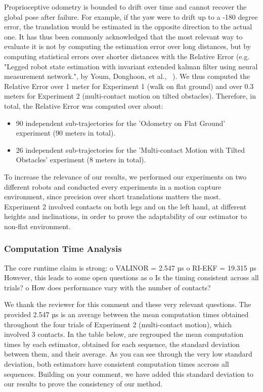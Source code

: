 Proprioceptive odometry is bounded to drift over time and cannot recover the global pose after failure. For example, if the yaw were to drift up to a -180 degree error, the translation would be estimated in the opposite direction to the actual one. It has thus been commonly acknowledged that the most relevant way to evaluate it is not by computing the estimation error over long distances, but by computing statistical errors over shorter distances with the Relative Error (e.g. "Legged robot state estimation with invariant extended kalman filter using neural measurement network.", by Youm, Donghoon, et al., ~\cite{yoon2023InvariantSmootherDynamicContactEventInformation}). We thus computed the Relative Error over 1 meter for Experiment 1 (walk on flat ground) and over 0.3 meters for Experiment 2 (multi-contact motion on tilted obstacles). Therefore, in total, the Relative Error was computed over about:
\begin{itemize}
    \item 90 independent sub-trajectories for the 'Odometry on Flat Ground' experiment (90 meters in total).
    \item 26 independent sub-trajectories for the 'Multi-contact Motion with Tilted Obstacles' experiment (8 meters in total).
\end{itemize}
To increase the relevance of our results, we performed our experiments on two different robots and conducted every experiments in a motion capture environment, since precision over short translations matters the most. Experiment 2 involved contacts on both legs and on the left hand, at different heights and inclinations, in order to prove the adaptability of our estimator to non-flat environment.



\subsubsection{Computation Time Analysis}

\begin{revquote}
The core runtime claim is strong:
      o VALINOR = 2.547 µs
      o RI-EKF = 19.315 µs
However, this leads to some open questions as
      o Is the timing consistent across all trials?
      o How does performance vary with the number of contacts?
    
\end{revquote}

We thank the reviewer for this comment and these very relevant questions. The provided 2.547 µs is an average between the mean computation times obtained throughout the four trials of Experiment 2 (multi-contact motion), which involved 3 contacts. In the table below, are regrouped the mean computation times by each estimator, obtained for each sequence, the standard deviation between them, and their average. As you can see through the very low standard deviation, both estimators have consistent computation times accross all sequences. 
Building on your comment, we have added this standard deviation to our results to prove the consistency of our method.

